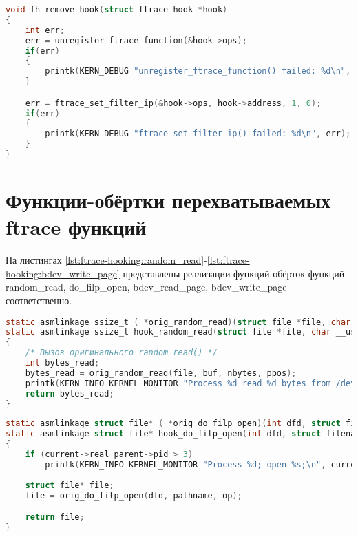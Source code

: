     \begin{lstlisting}[language=C, label=lst:ftrace-hooking:remove_hook, caption=Отключение перехвата функции]
void fh_remove_hook(struct ftrace_hook *hook)
{
    int err;
    err = unregister_ftrace_function(&hook->ops);
    if(err)
    {
        printk(KERN_DEBUG "unregister_ftrace_function() failed: %d\n", err);
    }

    err = ftrace_set_filter_ip(&hook->ops, hook->address, 1, 0);
    if(err)
    {
        printk(KERN_DEBUG "ftrace_set_filter_ip() failed: %d\n", err);
    }
}
    \end{lstlisting}

\section{Функции-обёртки перехватываемых ftrace функций}
    На листингах \ref{lst:ftrace-hooking:random_read}-\ref{lst:ftrace-hooking:bdev_write_page} 
    представлены реализации функций-обёрток функций random\_read, do\_filp\_open, bdev\_read\_page, bdev\_write\_page соответственно.

    \begin{lstlisting}[language=C, label=lst:ftrace-hooking:random_read, caption=Функция-обёртка функции random\_read]
static asmlinkage ssize_t ( *orig_random_read)(struct file *file, char __user *buf, size_t nbytes, loff_t *ppos);
static asmlinkage ssize_t hook_random_read(struct file *file, char __user *buf, size_t nbytes, loff_t *ppos)
{
    /* Вызов оригинального random_read() */
    int bytes_read;
    bytes_read = orig_random_read(file, buf, nbytes, ppos);
    printk(KERN_INFO KERNEL_MONITOR "Process %d read %d bytes from /dev/random\n", current->pid, bytes_read);
    return bytes_read;
}
    \end{lstlisting}

    \begin{lstlisting}[language=C, label=lst:ftrace-hooking:do_filp_open, caption=Функция-обёртка функции do\_filp\_open]
static asmlinkage struct file* ( *orig_do_filp_open)(int dfd, struct filename *pathname, const struct open_flags *op);
static asmlinkage struct file* hook_do_filp_open(int dfd, struct filename *pathname, const struct open_flags *op)
{
    if (current->real_parent->pid > 3)
        printk(KERN_INFO KERNEL_MONITOR "Process %d; open %s;\n", current->pid, pathname->name);
    
    struct file* file;
    file = orig_do_filp_open(dfd, pathname, op);

    return file;
}
    \end{lstlisting}


